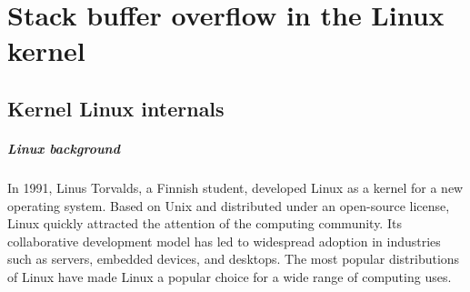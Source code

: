 \chapter{Stack buffer overflow in the Linux kernel}
    \section{Kernel Linux internals}
    \paragraph{Linux background}
    In 1991, Linus Torvalds, a Finnish student, developed Linux as a kernel for a new operating system. Based on Unix and distributed under an open-source license, Linux quickly attracted the attention of the computing community. \newline
    Its collaborative development model has led to widespread adoption in industries such as servers, embedded devices, and desktops.\newline
    The most popular distributions of Linux have made Linux a popular choice for a wide range of computing uses.\newline
